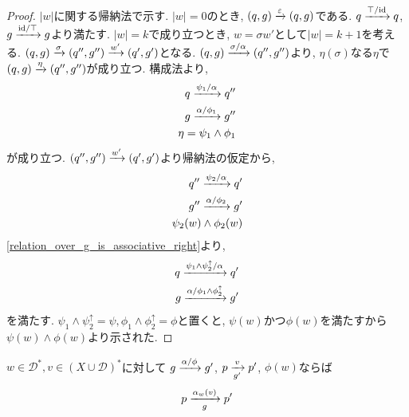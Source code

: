 \documentclass[uplatex,dvipdfmx,a4j]{jsreport}
\begin{document}
  \begin{proof}
    $|w|$に関する帰納法で示す.
    $|w| = 0$のとき, $(q, g) \transarrow{\varepsilon}{} (q, g)$である.
    $q \transarrow{\top / \scriptsize \id}{} q$,
    $g \transarrow{\scriptsize \id / \top}{} g$より満たす.
    $|w| = k$で成り立つとき, $w = \sigma w'$として$|w| = k + 1$を考える.
    $(q, g) \transarrow{\sigma}{} (q'', g'') \transarrow{w'}{} (q', g')$となる.
    $(q, g) \transarrow{\sigma / \alpha}{} (q'', g'')$より,
    $\eta(\sigma)$なる$\eta$で$(q, g) \transarrow{\eta}{} (q'', g'')$が成り立つ.
    構成法より,
    \begin{align*}
      q \transarrow{\psi_1 / \alpha}{} q'' \\
      g \transarrow{\alpha / \phi_1}{} g'' \\
      \eta = \psi_1 \land \phi_1
    \end{align*}
    が成り立つ.
    $(q'', g'') \transarrow{w'}{} (q', g')$より帰納法の仮定から,
    \begin{align*}
      q'' \transarrow{\psi_2 / \alpha}{} q' \\
      g'' \transarrow{\alpha / \phi_2}{} g' \\
      \psi_2(w) \land \phi_2(w)
    \end{align*}
    \ref{relation_over_g_is_associative_right}より,
    \begin{align*}
      q \transarrow{\psi_1 \land \psi_2^\uparrow / \alpha}{} q' \\
      g \transarrow{\alpha / \phi_1 \land \phi_2^\uparrow}{} g'
    \end{align*}
    を満たす.
    $\psi_1 \land \psi_2^\uparrow = \psi, \phi_1 \land \phi_2^\uparrow = \phi$と置くと,
    $\psi(w)$かつ$\phi(w)$を満たすから$\psi(w) \land \phi(w)$より示された.
  \end{proof}

  \begin{lemma} \label{outputfunction_is_reducible}
    $w \in \mathcal{D}^*, v \in (X \cup \mathcal{D})^*$に対して
    $g \transarrow{\alpha / \phi}{} g'$, $p \transarrow{v}{g'} p'$, $\phi(w)$ならば
    \[
      p \transarrow{\alpha_w(v)}{g} p'
    \]
  \end{lemma}
\end{document}
